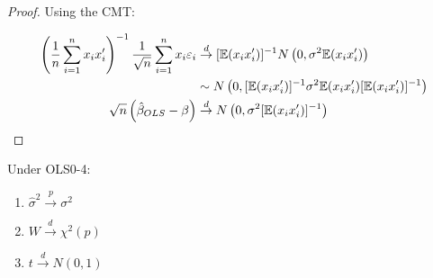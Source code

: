 \documentclass[DIV=14,titlepage=false]{scrreprt}
\begin{document}
\begin{proof}
Using the CMT: 

\begin{align*}
    \left(\frac{1}{n}\sum_{i=1}^{n} x_i x_i'\right)^{-1} \frac{1}{\sqrt{n}}\sum_{i=1}^{n} x_i \varepsilon_i & \overset{d}{\to} [\mathbb{E}(x_ix_i')]^{-1} N\left(0,\sigma^2\mathbb{E}(x_ix_i')\right)\\
    &\sim N\left(0, [\mathbb{E}(x_ix_i')]^{-1}\sigma^2\mathbb{E}(x_ix_i')[\mathbb{E}(x_ix_i')]^{-1}\right)\\
    \sqrt{n}\left(\hat\beta_{OLS} - \beta\right) & \overset{d}{\to} N\left(0, \sigma^2[\mathbb{E}(x_ix_i')]^{-1}\right)
\end{align*}
\end{proof}
\begin{theorem}
    Under OLS0-4:
    \begin{enumerate}
        \item $\hat\sigma^2 \overset{p}{\to} \sigma^2$
        \item $W \overset{d}{\to} \chi^2(p)$
        \item $t \overset{d}{\to} N(0,1)$
    \end{enumerate}
\end{theorem}
\end{document}
